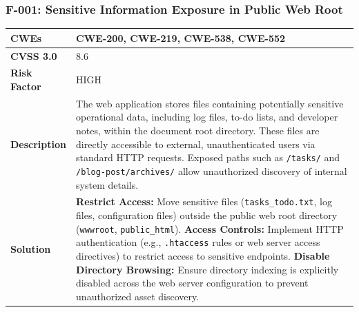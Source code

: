 \subsubsection{F-001: Sensitive Information Exposure in Public Web Root}
\begin{tabular}{|p{2.8cm}|p{12.2cm}|}
\hline
\textbf{CWEs} & CWE-200, CWE-219, CWE-538, CWE-552 \\ \hline
\textbf{CVSS 3.0} & 8.6 \\ \hline
\textbf{Risk Factor} & HIGH \\ \hline
\textbf{Description} & The web application stores files containing potentially sensitive operational data, including log files, to-do lists, and developer notes, within the document root directory. These files are directly accessible to external, unauthenticated users via standard HTTP requests. Exposed paths such as \texttt{/tasks/} and \texttt{/blog-post/archives/} allow unauthorized discovery of internal system details. \\ \hline
\textbf{Solution} & \textbf{Restrict Access:} Move sensitive files (\texttt{tasks\_todo.txt}, log files, configuration files) outside the public web root directory (\texttt{wwwroot}, \texttt{public\_html}). \newline \textbf{Access Controls:} Implement HTTP authentication (e.g., \texttt{.htaccess} rules or web server access directives) to restrict access to sensitive endpoints. \newline \textbf{Disable Directory Browsing:} Ensure directory indexing is explicitly disabled across the web server configuration to prevent unauthorized asset discovery. \\ \hline
\end{tabular}

